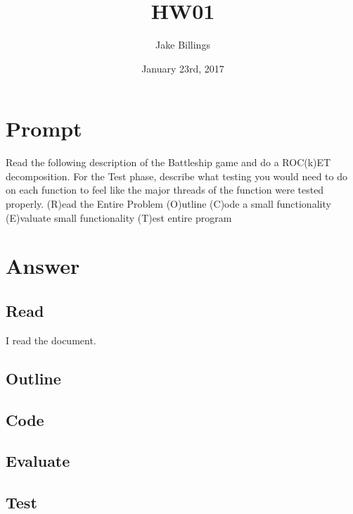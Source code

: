 \documentclass{article}
\title{HW01}
\author{Jake Billings}
\date{January 23rd, 2017}
\begin{document}
\maketitle

\section{Prompt}
Read the following description of the Battleship game and do a ROC(k)ET decomposition.  For the Test phase, describe what testing you would need to do on each function to feel like the major threads of the function were tested properly.
(R)ead the Entire Problem
(O)utline
(C)ode a small functionality
(E)valuate small functionality
(T)est entire program


\section{Answer}
\subsection{Read}
I read the document.
\subsection{Outline}

\subsection{Code}
\subsection{Evaluate}
\subsection{Test}
\end{document}
